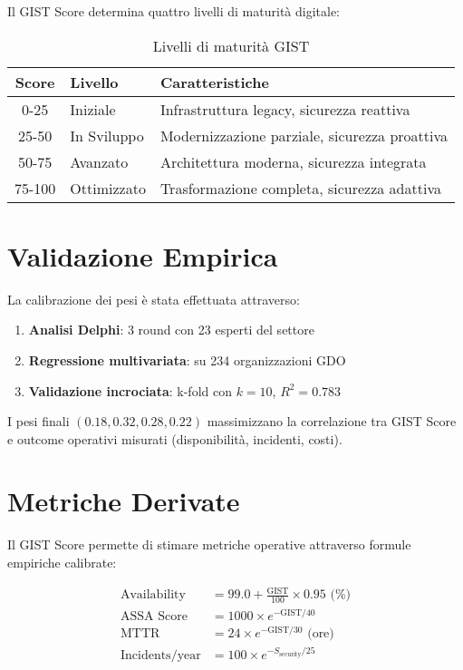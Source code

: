 Il GIST Score determina quattro livelli di maturità digitale:

\begin{table}[H]
\centering
\caption{Livelli di maturità GIST}
\small
\begin{tabular}{c l l}
\toprule
\textbf{Score} & \textbf{Livello} & \textbf{Caratteristiche} \\
\midrule
0-25 & Iniziale & Infrastruttura legacy, sicurezza reattiva \\
25-50 & In Sviluppo & Modernizzazione parziale, sicurezza proattiva \\
50-75 & Avanzato & Architettura moderna, sicurezza integrata \\
75-100 & Ottimizzato & Trasformazione completa, sicurezza adattiva \\
\bottomrule
\end{tabular}
\end{table}

\section{\texorpdfstring{Validazione Empirica}{B.5 - Validazione Empirica}}

La calibrazione dei pesi è stata effettuata attraverso:

\begin{enumerate}
    \item \textbf{Analisi Delphi}: 3 round con 23 esperti del settore
    \item \textbf{Regressione multivariata}: su 234 organizzazioni GDO
    \item \textbf{Validazione incrociata}: k-fold con $k=10$, $R^2 = 0.783$
\end{enumerate}

I pesi finali $(0.18, 0.32, 0.28, 0.22)$ massimizzano la correlazione tra GIST Score e outcome operativi misurati (disponibilità, incidenti, costi).

\section{\texorpdfstring{Metriche Derivate}{B.6 - Metriche Derivate}}

Il GIST Score permette di stimare metriche operative attraverso formule empiriche calibrate:

\begin{align}
\text{Availability} &= 99.0 + \frac{\text{GIST}}{100} \times 0.95 \text{ (\%)} \\
\text{ASSA Score} &= 1000 \times e^{-\text{GIST}/40} \\
\text{MTTR} &= 24 \times e^{-\text{GIST}/30} \text{ (ore)} \\
\text{Incidents/year} &= 100 \times e^{-S_{\text{security}}/25}
\end{align}

